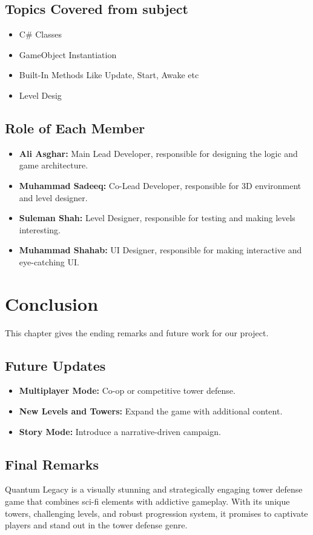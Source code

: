 \documentclass[12pt,a4paper]{report}
\begin{document}
\section{Topics Covered from subject} 
\begin{itemize}
	\item C\# Classes
	\item GameObject Instantiation 
	\item Built-In Methods Like Update, Start, Awake etc
	\item Level Desig
\end{itemize}

\section{Role of Each Member} 

\begin{itemize}
	\item \textbf{Ali Asghar:} Main Lead Developer, responsible for designing the logic and game architecture.
	\item \textbf{Muhammad Sadeeq:} Co-Lead Developer, responsible for 3D environment and level designer.  
	\item \textbf{Suleman Shah:} Level Designer, responsible for testing and making levels interesting.
	\item \textbf{Muhammad Shahab:} UI Designer, responsible for making interactive and eye-catching UI.
\end{itemize}

\chapter{Conclusion}
This chapter gives the ending remarks and future work for our project.

\section{Future Updates}
\begin{itemize}
	\item \textbf{Multiplayer Mode:} Co-op or competitive tower defense. 
	\item \textbf{New Levels and Towers:} Expand the game with additional content.  
	\item \textbf{Story Mode:} Introduce a narrative-driven campaign. 
\end{itemize}
 
\section{Final Remarks}
Quantum Legacy is a visually stunning and strategically engaging tower defense game that combines sci-fi elements with addictive gameplay. With its unique towers, challenging levels, and robust progression system, it promises to captivate players and stand out in the tower defense genre.  
  
\end{document}
